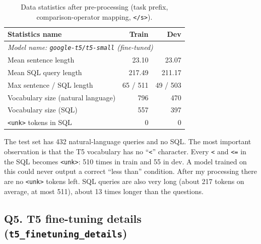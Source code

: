\documentclass[11pt]{article}
\begin{document}
\begin{table}[H]
\centering
\begin{tabular}{lrr}
\toprule
Statistics name & Train & Dev \\
\midrule
\multicolumn{3}{l}{\textit{Model name: \texttt{google-t5/t5-small} (fine-tuned)}} \\
Mean sentence length & 23.10 & 23.07 \\
Mean SQL query length & 217.49 & 211.17 \\
Max sentence / SQL length & 65 / 511 & 49 / 503 \\
Vocabulary size (natural language) & 796 & 470 \\
Vocabulary size (SQL) & 557 & 397 \\
\texttt{<unk>} tokens in SQL & 0 & 0 \\
\bottomrule
\end{tabular}
\caption{Data statistics after pre-processing (task prefix, comparison-operator mapping, \texttt{</s>}).}
\end{table}

The test set has 432 natural-language queries and no SQL. The most important observation is that the T5 vocabulary
has no ``\texttt{<}'' character. Every \texttt{<} and \texttt{<=} in the SQL becomes \texttt{<unk>}: 510 times in
train and 55 in dev. A model trained on this could never output a correct ``less than'' condition. After my
processing there are no \texttt{<unk>} tokens left. SQL queries are also very long (about 217 tokens on average, at
most 511), about 13 times longer than the questions.

\subsection{Q5. T5 fine-tuning details (\texttt{t5\_finetuning\_details})}
\end{document}
